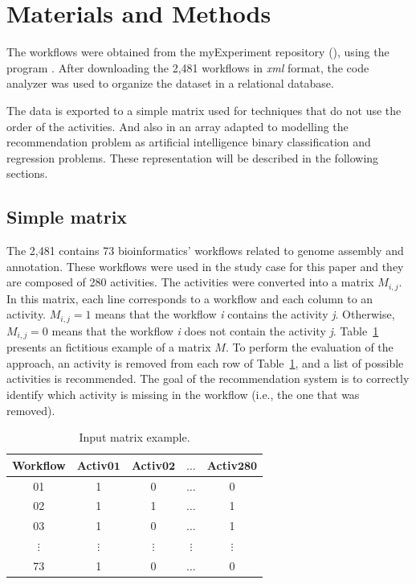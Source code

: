 \documentclass{doublecol-new}
\theoremstyle{TH}{
\newtheorem{lemma}{Lemma}
\newtheorem{theorem}[lemma]{Theorem}
\newtheorem{corrolary}[lemma]{Corrolary}
\newtheorem{conjecture}[lemma]{Conjecture}
\newtheorem{proposition}[lemma]{Proposition}
\newtheorem{claim}[lemma]{Claim}
\newtheorem{stheorem}[lemma]{Wrong Theorem}
\newtheorem{algorithm}{Algorithm}
}
\theoremstyle{THrm}{
\newtheorem{definition}{Definition}[section]
\newtheorem{question}{Question}[section]
\newtheorem{remark}{Remark}
\newtheorem{scheme}{Scheme}
}
\theoremstyle{THhit}{
\newtheorem{case}{Case}[section]
}
\begin{document}
\section*{Materials and Methods} \label{mat_met}
The workflows were obtained from the myExperiment repository (\cite{ROURE2015}), using the program \cite{wget2015}. After downloading the 2,481 workflows in \emph{xml} format, the \cite{BeautifulSoup2015} code analyzer was used to organize the dataset in a relational database.

The data is exported to a simple matrix used for techniques that do not use the order of the activities. And also in an array adapted to modelling the recommendation problem as artificial intelligence binary classification and regression problems. These representation will be described in the following sections.


\subsection*{Simple matrix}
The 2,481 contains 73 bioinformatics' workflows related to genome assembly and annotation. These workflows were used in the study case for this paper and they are composed of 280 activities. The activities were converted into a matrix $M_{i, j}$. In this matrix, each line corresponds to a workflow and each column to an activity. $M_{i, j} = 1$ means that the workflow \emph{i} contains the activity \emph{j}. Otherwise, $M_{i, j} = 0$ means that the workflow \emph{i} does not contain the activity \emph{j}. Table~\ref{tabela_matriz_de_dados} presents an fictitious example of a matrix \(M\). To perform the evaluation of the approach, an activity is removed from each row of Table~\ref{tabela_matriz_de_dados}, and a list of possible activities is recommended. The goal of the recommendation system is to correctly identify which activity is missing in the workflow (i.e., the one that was removed).
\begin{table}[htb]
	\tiny
	\centering
	\caption{Input matrix example.}
	\begin{tabular}{|c|c|c|c|c|}  \hline
		\textbf{Workflow} & \textbf{Activ\(\mathbf{01}\)} & \textbf{Activ\(\mathbf{02}\)} & \textbf{\(\mathbf{\ldots}\)} & \textbf{Activ\(\mathbf{280}\)}  \\ \hline
		01 			  & 1 			  & 0 			  & \(\ldots\) 	  & 0  				\\ \hline
		02 			  & 1 			  & 1 			  & \(\ldots\) 	  & 1  				\\ \hline
		03 			  & 1 			  & 0 			  & \(\ldots\) 	  & 1  				\\ \hline
		\(\vdots\) 		  			  & \(\vdots\) 	  & \(\vdots\) 	  & \(\vdots\) 	  & \(\vdots\) 		\\ \hline
		73 			  & 1 			  & 0 			  & \(\ldots\) 	  & 0  				\\ \hline
	\end{tabular}
	\label{tabela_matriz_de_dados}
	\vspace{0.1cm}
\end{table}
\end{document}
